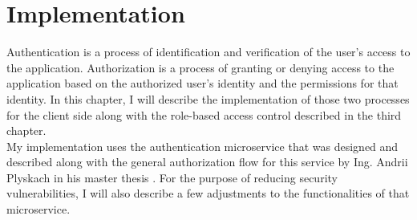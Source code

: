 \chapter{Implementation}\label{chap4}
Authentication is a process of identification and verification of the user's access to the application. Authorization is a process of granting or denying access to the application based on the authorized user's identity and the permissions for that identity. \cite{auth-def} In this chapter, I will describe the implementation of those two processes for the client side along with the role-based access control described in the third chapter.\\
My implementation uses the authentication microservice that was designed and described along with the general authorization flow for this service by Ing. Andrii Plyskach in his master thesis \cite{mt-plyskach}. For the purpose of reducing security vulnerabilities, I will also describe a few adjustments to the functionalities of that microservice.

















